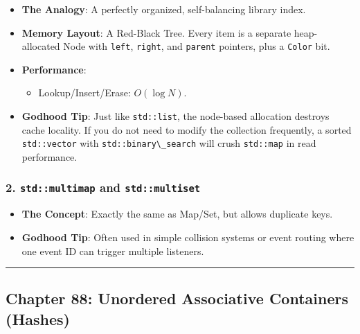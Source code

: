 \begin{itemize}
\tightlist
\item
  \textbf{The Analogy}: A perfectly organized, self-balancing library
  index.
\item
  \textbf{Memory Layout}: A Red-Black Tree. Every item is a separate
  heap-allocated Node with \passthrough{\lstinline!left!},
  \passthrough{\lstinline!right!}, and \passthrough{\lstinline!parent!}
  pointers, plus a \passthrough{\lstinline!Color!} bit.
\item
  \textbf{Performance}:

  \begin{itemize}
  \tightlist
  \item
    Lookup/Insert/Erase: \(O(\log N)\).
  \end{itemize}
\item
  \textbf{Godhood Tip}: Just like \passthrough{\lstinline!std::list!},
  the node-based allocation destroys cache locality. If you do not need
  to modify the collection frequently, a sorted
  \passthrough{\lstinline!std::vector!} with
  \passthrough{\lstinline!std::binary\_search!} will crush
  \passthrough{\lstinline!std::map!} in read performance.
\end{itemize}

\hypertarget{stdmultimap-and-stdmultiset}{%
\subsubsection{\texorpdfstring{2. \texttt{std::multimap} and
\texttt{std::multiset}}{2. std::multimap and std::multiset}}\label{stdmultimap-and-stdmultiset}}

\begin{itemize}
\tightlist
\item
  \textbf{The Concept}: Exactly the same as Map/Set, but allows
  duplicate keys.
\item
  \textbf{Godhood Tip}: Often used in simple collision systems or event
  routing where one event ID can trigger multiple listeners.
\end{itemize}

\begin{center}\rule{0.5\linewidth}{0.5pt}\end{center}

\hypertarget{chapter-88-unordered-associative-containers-hashes}{%
\subsection{Chapter 88: Unordered Associative Containers
(Hashes)}\label{chapter-88-unordered-associative-containers-hashes}}

